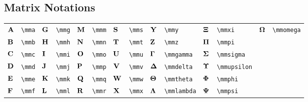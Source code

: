 \documentclass{article}
\begin{document}
\subsection{Matrix Notations}
\begin{longtable}{*{14}{l}}
${\mathbf A}$ & \lstinline`\mma` & ${\mathbf G}$ & \lstinline`\mmg` & ${\mathbf M}$ & \lstinline`\mmm` & ${\mathbf S}$ & \lstinline`\mms` & ${\mathbf Y}$ & \lstinline`\mmy` & ${\bm \Xi}$ & \lstinline`\mmxi` & ${\bm \Omega}$ & \lstinline`\mmomega`\\
${\mathbf B}$ & \lstinline`\mmb` & ${\mathbf H}$ & \lstinline`\mmh` & ${\mathbf N}$ & \lstinline`\mmn` & ${\mathbf T}$ & \lstinline`\mmt` & ${\mathbf Z}$ & \lstinline`\mmz` & ${\bm \Pi}$ & \lstinline`\mmpi` & \\
${\mathbf C}$ & \lstinline`\mmc` & ${\mathbf I}$ & \lstinline`\mmi` & ${\mathbf O}$ & \lstinline`\mmo` & ${\mathbf U}$ & \lstinline`\mmu` & ${\bm \Gamma}$ & \lstinline`\mmgamma` & ${\bm \Sigma}$ & \lstinline`\mmsigma` & \\
${\mathbf D}$ & \lstinline`\mmd` & ${\mathbf J}$ & \lstinline`\mmj` & ${\mathbf P}$ & \lstinline`\mmp` & ${\mathbf V}$ & \lstinline`\mmv` & ${\bm \Delta}$ & \lstinline`\mmdelta` & ${\bm \Upsilon}$ & \lstinline`\mmupsilon` & \\
${\mathbf E}$ & \lstinline`\mme` & ${\mathbf K}$ & \lstinline`\mmk` & ${\mathbf Q}$ & \lstinline`\mmq` & ${\mathbf W}$ & \lstinline`\mmw` & ${\bm \Theta}$ & \lstinline`\mmtheta` & ${\bm \Phi}$ & \lstinline`\mmphi` & \\
${\mathbf F}$ & \lstinline`\mmf` & ${\mathbf L}$ & \lstinline`\mml` & ${\mathbf R}$ & \lstinline`\mmr` & ${\mathbf X}$ & \lstinline`\mmx` & ${\bm \Lambda}$ & \lstinline`\mmlambda` & ${\bm \Psi}$ & \lstinline`\mmpsi` & \\
\end{longtable}
\end{document}
